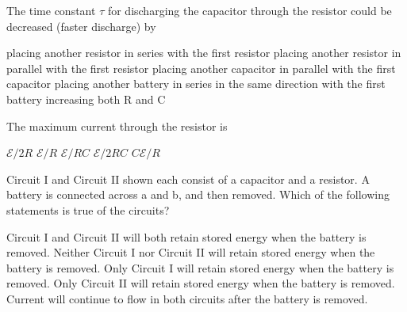 \documentclass{../../oss-classkick-exam}
\begin{document}
\begin{multicols}{2}
\begin{questions}
  \question The time constant $\tau$ for discharging the capacitor through the
  resistor could be decreased (faster discharge) by
  \label{switch1}
  \begin{choices}
    \choice placing another resistor in series with the first resistor
    \choice placing another resistor in parallel with the first resistor
    \choice placing another capacitor in parallel with the first capacitor
    \choice placing another battery in series in the same direction with the
    first battery
    \choice increasing both R and C
  \end{choices}
    
  \question The maximum current through the resistor is
  \label{switch2}
  \begin{choices}
    \choice $\mathcal E/2R$
    \choice $\mathcal E/R$
    \choice $\mathcal E/RC$
    \choice $\mathcal E/2RC$
    \choice $C\mathcal E/R$
  \end{choices}
  \columnbreak
  
  \question Circuit I and Circuit II shown each consist of a capacitor and a
  resistor. A battery is connected across a and b, and then removed. Which of
  the following statements is true of the circuits?
  \begin{center}
    \hspace{.5in}
  \end{center}
  \begin{choices}
    \choice Circuit I and Circuit II will both retain stored energy when the
    battery is removed.
    \choice Neither Circuit I nor Circuit II will retain stored energy when
    the battery is removed.
    \choice Only Circuit I will retain stored energy when the battery is
    removed.
    \choice Only Circuit II will retain stored energy when the battery is
    removed.
    \choice Current will continue to flow in both circuits after the battery
    is removed.
  \end{choices}


\end{questions}
\end{multicols}
\end{document}
